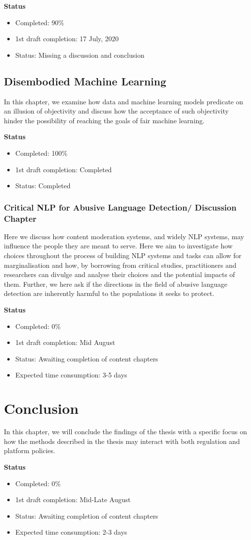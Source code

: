 {\textbf{Status}
\begin{itemize}
    \item Completed: 90\%
    \item 1st draft completion: 17 July, 2020
    \item Status: Missing a discussion and conclusion
\end{itemize}

\subsection{Disembodied Machine Learning}
In this chapter, we examine how data and machine learning models predicate on an illusion of objectivity and discuss how the acceptance of such objectivity hinder the possibility of reaching the goals of fair machine learning.

\textbf{Status}
\begin{itemize}
    \item Completed: 100\%
    \item 1st draft completion: Completed
    \item Status: Completed
\end{itemize}

\subsubsection{Critical NLP for Abusive Language Detection/ Discussion Chapter}
Here we discuss how content moderation systems, and widely NLP systems, may influence the people they are meant to serve. Here we aim to investigate how choices throughout the process of building NLP systems and tasks can allow for marginalisation and how, by borrowing from critical studies, practitioners and researchers can divulge and analyse their choices and the potential impacts of them. Further, we here ask if the directions in the field of abusive language detection are inherently harmful to the populations it seeks to protect.

\textbf{Status}
\begin{itemize}
    \item Completed: 0\%
    \item 1st draft completion: Mid August
    \item Status: Awaiting completion of content chapters
    \item Expected time consumption: 3-5 days
\end{itemize}

\section{Conclusion}
In this chapter, we will conclude the findings of the thesis with a specific focus on how the methods described in the thesis may interact with both regulation and platform policies.

\textbf{Status}
\begin{itemize}
    \item Completed: 0\%
    \item 1st draft completion: Mid-Late August
    \item Status: Awaiting completion of content chapters
    \item Expected time consumption: 2-3 days
\end{itemize}
}